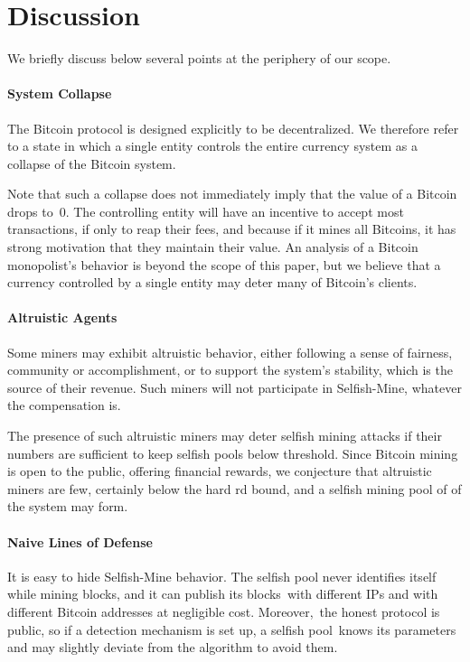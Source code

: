 \documentclass[letterpaper]{llncs}
\newcommand{\negspace}{\vspace{-0.5\baselineskip}}
\begin{document}
    \negspace
    \section{Discussion} \label{sec:discussion} 
    \negspace

We briefly discuss below several points at the periphery of our scope. 

\paragraph{System Collapse} 

The Bitcoin protocol is designed explicitly to be decentralized. 
We therefore refer to a state in which a single entity controls the entire currency system as a collapse of the Bitcoin system. 

Note that such a collapse does not immediately imply that the value of a Bitcoin drops to~0. 
The controlling entity will have an incentive to accept most transactions, if only to reap their fees, and because if it mines all Bitcoins, it has strong motivation that they maintain their value. 
An analysis of a Bitcoin monopolist's behavior is beyond the scope of this paper, but we believe that a currency controlled by a single entity may deter many of Bitcoin's clients. 

\paragraph{Altruistic Agents} 

Some miners may exhibit altruistic behavior, either following a sense of fairness, community or accomplishment, or to support the system's stability, which is the source of their revenue. Such miners will not participate in Selfish-Mine, whatever the compensation is. 

The presence of such altruistic miners may deter selfish mining attacks if their numbers are sufficient to keep selfish pools below threshold. 
Since Bitcoin mining is open to the public, offering financial rewards, we conjecture that altruistic miners are few, certainly below the hard rd bound, and a selfish mining pool of  of the system may form. 

\paragraph{Naive Lines of Defense} 

It is easy to hide Selfish-Mine behavior. The selfish pool never identifies itself while mining blocks, and it can publish its blocks~with different IPs and with different Bitcoin addresses at negligible cost. Moreover,~the honest protocol is public, so if a detection mechanism is set up, a selfish pool~knows its parameters and may slightly deviate from the algorithm to avoid them. 
\end{document}
